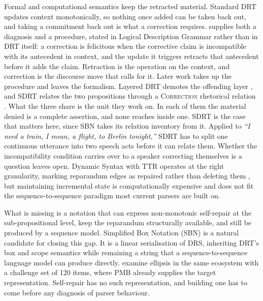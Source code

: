 \documentclass{article}
\begin{document}
Formal and computational semantics keep the retracted material. Standard DRT
\citep{Kamp1995} updates context monotonically, so nothing once added can be
taken back out, and taking a commitment back out is what a correction requires.
\citet{vanleusenIncompatibilityContextDiagnosis2004} supplies both a diagnosis
and a procedure, stated in Logical Description Grammar rather than in DRT itself:
a correction is felicitous when the corrective claim is incompatible with its
antecedent in context, and the update it triggers retracts that antecedent before
it adds the claim. Retraction is the operation on the context, and correction is
the discourse move that calls for it. Later work takes up the procedure and
leaves the formalism. Layered DRT demotes the offending layer
\citep{maierDenialCorrectionLayered2007}, and SDRT relates the two propositions
through a \textsc{Correction} rhetorical relation
\citep{lascaridesSegmentedDiscourseRepresentation2007}. What the three share is
the unit they work on. In each of them the material denied is a complete
assertion, and none reaches inside one. SDRT is the case that matters here, since
SBN takes its relation inventory from it. Applied to \textit{``I need a train, I
mean, a flight, to Berlin tonight,''} SDRT has to split one continuous utterance
into two speech acts before it can relate them. Whether the incompatibility
condition carries over to a speaker correcting themselves is a question
\citet{vanleusenIncompatibilityContextDiagnosis2004} leaves open.
Dynamic Syntax with TTR operates at the right granularity, marking reparandum
edges as repaired rather than deleting them
\citep{houghProcessingSelfrepairsIncremental2012, eshghiLearningGenerateCorr2023},
but maintaining incremental state is computationally expensive and does not fit
the sequence-to-sequence paradigm most current parsers are built on.

What is missing is a notation that can express non-monotonic self-repair at the
sub-propositional level, keep the reparandum structurally available, and still
be produced by a sequence model. Simplified Box Notation (SBN) \citep{bosSBN}
is a natural candidate for closing this gap. It is a linear serialisation of DRS,
inheriting DRT's box and scope semantics while remaining a string that a
sequence-to-sequence language model can produce directly. \citet{zhangEllipsisResolution2025} examine ellipsis in the same ecosystem with a
challenge set of 120 items, where PMB already supplies the target representation. %
Self-repair has no such representation, and building one has to come before any
diagnosis of parser behaviour.
\end{document}
